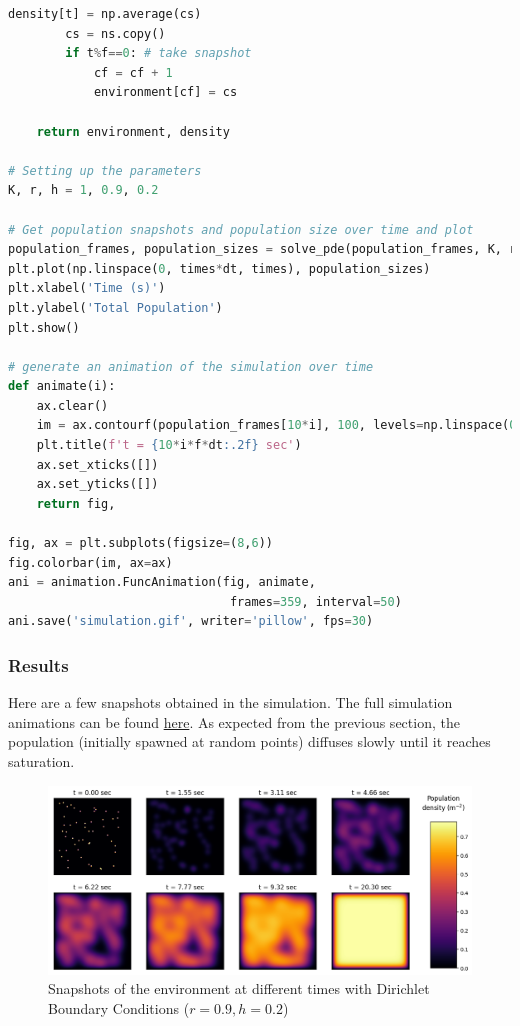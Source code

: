 \begin{lstlisting}[language=Python, caption=Code to simulate the hunting and diffusion model]
        density[t] = np.average(cs)
        cs = ns.copy()
        if t%f==0: # take snapshot
            cf = cf + 1
            environment[cf] = cs
            
    return environment, density

# Setting up the parameters
K, r, h = 1, 0.9, 0.2

# Get population snapshots and population size over time and plot
population_frames, population_sizes = solve_pde(population_frames, K, r, h)
plt.plot(np.linspace(0, times*dt, times), population_sizes)
plt.xlabel('Time (s)')
plt.ylabel('Total Population')
plt.show()

# generate an animation of the simulation over time
def animate(i):
    ax.clear()
    im = ax.contourf(population_frames[10*i], 100, levels=np.linspace(0,np.max(population_sizes),50))
    plt.title(f't = {10*i*f*dt:.2f} sec')
    ax.set_xticks([]) 
    ax.set_yticks([]) 
    return fig,

fig, ax = plt.subplots(figsize=(8,6))
fig.colorbar(im, ax=ax)
ani = animation.FuncAnimation(fig, animate,
                               frames=359, interval=50)
ani.save('simulation.gif', writer='pillow', fps=30)
\end{lstlisting}

\subsubsection{Results}

Here are a few snapshots obtained in the simulation. The full simulation animations can be found \href{https://gayatri-p.github.io/p346-computational-physics/hunting2.html}{here}. 
As expected from the previous section, the population (initially spawned at random points) diffuses slowly until it reaches saturation.

\begin{figure}[H]
    \centering
    \includegraphics[width=1\linewidth]{Figures/5/5b/dirchlet.png}
    \caption{Snapshots of the environment at different times with Dirichlet Boundary Conditions ($r=0.9,h=0.2$)}
\end{figure}

